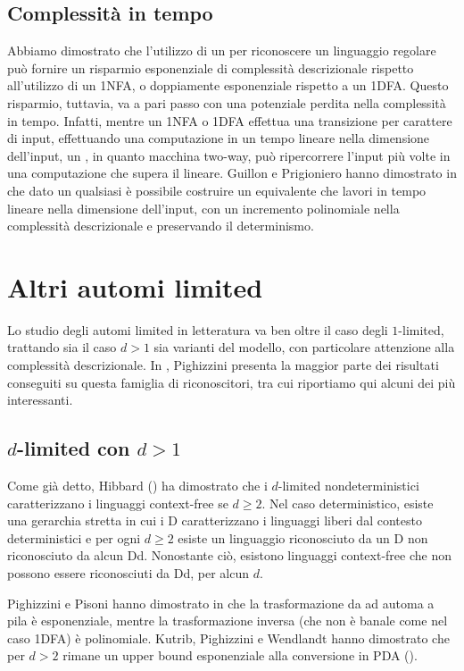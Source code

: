 \subsection{Complessità in tempo}
Abbiamo dimostrato che l'utilizzo di un  per riconoscere un linguaggio regolare può fornire un risparmio esponenziale di complessità descrizionale rispetto all'utilizzo di un 1NFA, o doppiamente esponenziale rispetto a un 1DFA. Questo risparmio, tuttavia, va a pari passo con una potenziale perdita nella complessità in tempo. Infatti, mentre un 1NFA o 1DFA effettua una transizione per carattere di input, effettuando una computazione in un tempo lineare nella dimensione dell'input, un , in quanto macchina two-way, può ripercorrere l'input più volte in una computazione che supera il lineare. Guillon e Prigioniero hanno dimostrato in \cite{Guillon:19:linearlimited} che dato un qualsiasi  è possibile costruire un  equivalente che lavori in tempo lineare nella dimensione dell'input, con un incremento polinomiale nella complessità descrizionale e preservando il determinismo.



\section{Altri automi limited}
Lo studio degli automi limited in letteratura va ben oltre il caso degli $1$-limited, trattando sia il caso $d>1$ sia varianti del modello, con particolare attenzione alla complessità descrizionale. In \cite{Pighizzini:19:limited}, Pighizzini presenta la maggior parte dei risultati conseguiti su questa famiglia di riconoscitori, tra cui riportiamo qui alcuni dei più interessanti.


\subsection{\texorpdfstring{$d$-limited con $d>1$}{d-limited con d>1}}
Come già detto, Hibbard (\cite{Hibbard:67:CFdet}) ha dimostrato che i $d$-limited nondeterministici caratterizzano i linguaggi context-free se $d\geq2$. Nel caso deterministico, esiste una gerarchia stretta in cui i D caratterizzano i linguaggi liberi dal contesto deterministici e per ogni $d\geq2$ esiste un linguaggio riconosciuto da un D non riconosciuto da alcun D\la d. Nonostante ciò, esistono linguaggi context-free che non possono essere riconosciuti da D\la d, per alcun $d$.

Pighizzini e Pisoni hanno dimostrato in \cite{Pighizzini:14:limitedCF} che la trasformazione da  ad automa a pila è esponenziale, mentre la trasformazione inversa (che non è banale come nel caso 1DFA\tto{}) è polinomiale. Kutrib, Pighizzini e Wendlandt hanno dimostrato che per $d>2$ rimane un upper bound esponenziale alla conversione in PDA (\cite{Kutrib:18:complexlimited}).


